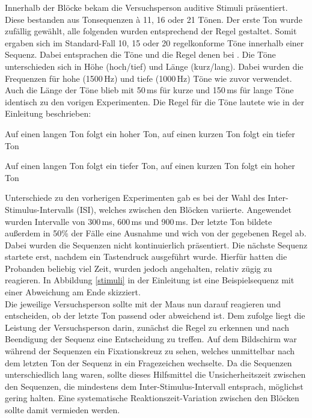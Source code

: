 \documentclass[doc,a4paper,12pt]{apa6}
\begin{document}
Innerhalb der Blöcke bekam die Versuchsperson auditive Stimuli präsentiert. Diese bestanden aus Tonsequenzen à 11, 16 oder 21 Tönen. Der erste Ton wurde zufällig gewählt, alle folgenden wurden entsprechend der Regel gestaltet. Somit ergaben sich im Standard-Fall 10, 15 oder 20 regelkonforme Töne innerhalb einer Sequenz. Dabei entsprachen die Töne und die Regel denen bei \textcite{paavilainen2007preattentive}. Die Töne unterschieden sich in Höhe (hoch/tief) und Länge (kurz/lang). Dabei wurden die Frequenzen für hohe (1500\,Hz) und tiefe (1000\,Hz) Töne wie zuvor verwendet. Auch die Länge der Töne blieb mit 50\,ms für kurze und 150\,ms für lange Töne identisch zu den vorigen Experimenten. Die Regel für die Töne lautete wie in der Einleitung beschrieben:

\begin{compactitem}
  \item Auf einen langen Ton folgt ein hoher Ton, auf einen kurzen Ton folgt ein tiefer
Ton
  \item Auf einen langen Ton folgt ein tiefer Ton, auf einen kurzen Ton folgt ein hoher
Ton
\end{compactitem}

Unterschiede zu den vorherigen Experimenten gab es bei der Wahl des Inter-Stimulus-Intervalls (ISI), welches zwischen den Blöcken variierte. Angewendet wurden Intervalle von 300\,ms, 600\,ms und 900\,ms. Der letzte Ton bildete außerdem in 50\% der Fälle eine Ausnahme und wich von der gegebenen Regel ab. Dabei wurden die Sequenzen nicht kontinuierlich präsentiert. Die nächste Sequenz startete erst, nachdem ein Tastendruck ausgeführt wurde. Hierfür hatten die Probanden beliebig viel Zeit, wurden jedoch angehalten, relativ zügig zu reagieren. In Abbildung \ref{stimuli} in der Einleitung ist eine Beispielsequenz mit einer Abweichung am Ende skizziert.\\
Die jeweilige Versuchsperson sollte mit der Maus nun darauf reagieren und entscheiden, ob der letzte Ton passend oder abweichend ist. Dem zufolge liegt die Leistung der Versuchsperson darin, zunächst die Regel zu erkennen und nach Beendigung der Sequenz eine Entscheidung zu treffen. Auf dem Bildschirm war während der Sequenzen ein Fixationskreuz zu sehen, welches unmittelbar nach dem letzten Ton der Sequenz in ein Fragezeichen wechselte. Da die Sequenzen unterschiedlich lang waren, sollte dieses Hilfsmittel die Unsicherheitszeit zwischen den Sequenzen, die mindestens dem Inter-Stimulus-Intervall entsprach, möglichst gering halten. Eine systematische Reaktionszeit-Variation zwischen den Blöcken sollte damit vermieden werden.
\end{document}
